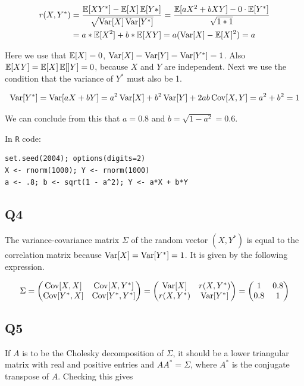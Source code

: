 \begin{align}
r(X, Y^*) & = \frac{\operatorname{\mathbb{E}}[X Y^*] - \operatorname{\mathbb{E}}[X] \operatorname{\mathbb{E}}[Y*]}{\sqrt{\operatorname{\text{Var}}[X] \operatorname{\text{Var}}[Y^*]}} = \frac{\operatorname{\mathbb{E}}[a X^2 + b X Y] - 0 \cdot \operatorname{\mathbb{E}}[Y^*]}{\sqrt{1 * 1}} \\
          & = a * \operatorname{\mathbb{E}}[X^2] + b * \operatorname{\mathbb{E}}[X Y] = a (\operatorname{\text{Var}}[X] - \operatorname{\mathbb{E}}[X]^2) = a
\end{align}

Here we use that $\operatorname{\mathbb{E}}[X] = 0$, $\operatorname{\text{Var}}[X] = \operatorname{\text{Var}}[Y] = \operatorname{\text{Var}}[Y^*] = 1$. Also $\operatorname{\mathbb{E}}[X Y] = \operatorname{\mathbb{E}}[X] \operatorname{\mathbb{E}}[]Y] = 0$, because $X$ and $Y$ are independent.
Next we use the condition that the variance of $Y^*$ must also be 1.

\begin{equation}
\operatorname{\text{Var}}[Y^*] = \operatorname{\text{Var}}[aX + bY] = a^2 \operatorname{\text{Var}}[X] + b^2 \operatorname{\text{Var}}[Y] + 2ab \operatorname{\text{Cov}}[X,Y] = a^2 + b^2 = 1
\end{equation}

We can conclude from this that $a = 0.8$ and $b = \sqrt{1 - a^2} = 0.6$.

In \verb|R| code:

\begin{verbatim}
set.seed(2004); options(digits=2)
X <- rnorm(1000); Y <- rnorm(1000)
a <- .8; b <- sqrt(1 - a^2); Y <- a*X + b*Y
\end{verbatim}

\subsection*{Q4}

The variance-covariance matrix $\Sigma$ of the random vector $(X, Y^*)$ is equal to the correlation matrix because $\operatorname{\text{Var}}[X] = \operatorname{\text{Var}}[Y^*] = 1$. It is given by the following expression.

\begin{equation}
\Sigma = 
\begin{pmatrix}
\operatorname{\text{Cov}}[X,X] & \operatorname{\text{Cov}}[X, Y^*] \\
\operatorname{\text{Cov}}[Y^*,X] & \operatorname{\text{Cov}}[Y^*, Y^*]
\end{pmatrix}
=
\begin{pmatrix}
\operatorname{\text{Var}}[X] & r(X,Y^*) \\
r(X, Y^*) & \operatorname{\text{Var}}[Y^*]
\end{pmatrix}
=
\begin{pmatrix}
1 & 0.8 \\
0.8 & 1
\end{pmatrix}
\end{equation}

\subsection*{Q5}
If $A$ is to be the Cholesky decomposition of $\Sigma$, it should be a lower triangular matrix with real and positive entries and $A A^* = \Sigma$, where $A^*$ is the conjugate transpose of $A$. Checking this gives


